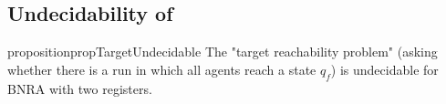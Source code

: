 \subsection{Undecidability of \Target}

\begin{restatable}{proposition}{propTargetUndecidable}
\label{prop:target-undec}
	The "target reachability problem" (asking whether there is a run in which all agents reach a state $q_f$) is undecidable for BNRA with two registers.
\end{restatable}

